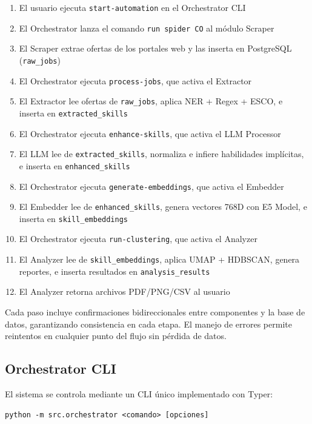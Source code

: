 \begin{enumerate}
    \item El usuario ejecuta \texttt{start-automation} en el Orchestrator CLI
    \item El Orchestrator lanza el comando \texttt{run spider CO} al módulo Scraper
    \item El Scraper extrae ofertas de los portales web y las inserta en PostgreSQL (\texttt{raw\_jobs})
    \item El Orchestrator ejecuta \texttt{process-jobs}, que activa el Extractor
    \item El Extractor lee ofertas de \texttt{raw\_jobs}, aplica NER + Regex + ESCO, e inserta en \texttt{extracted\_skills}
    \item El Orchestrator ejecuta \texttt{enhance-skills}, que activa el LLM Processor
    \item El LLM lee de \texttt{extracted\_skills}, normaliza e infiere habilidades implícitas, e inserta en \texttt{enhanced\_skills}
    \item El Orchestrator ejecuta \texttt{generate-embeddings}, que activa el Embedder
    \item El Embedder lee de \texttt{enhanced\_skills}, genera vectores 768D con E5 Model, e inserta en \texttt{skill\_embeddings}
    \item El Orchestrator ejecuta \texttt{run-clustering}, que activa el Analyzer
    \item El Analyzer lee de \texttt{skill\_embeddings}, aplica UMAP + HDBSCAN, genera reportes, e inserta resultados en \texttt{analysis\_results}
    \item El Analyzer retorna archivos PDF/PNG/CSV al usuario
\end{enumerate}

Cada paso incluye confirmaciones bidireccionales entre componentes y la base de datos, garantizando consistencia en cada etapa. El manejo de errores permite reintentos en cualquier punto del flujo sin pérdida de datos.

\subsection{Orchestrator CLI}

El sistema se controla mediante un CLI único implementado con Typer:

\begin{verbatim}
python -m src.orchestrator <comando> [opciones]
\end{verbatim}

